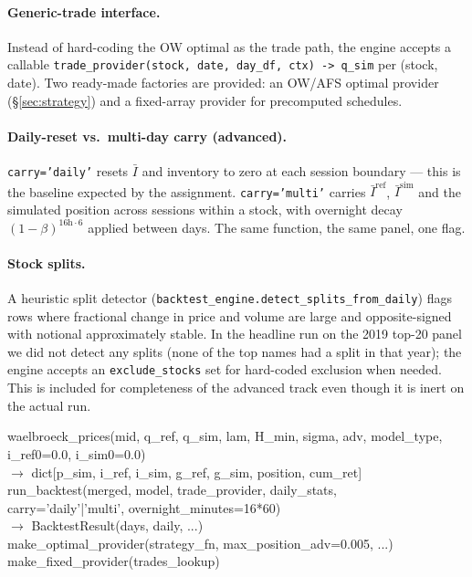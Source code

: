 \documentclass[11pt,a4paper]{article}
\begin{document}
\paragraph{Generic-trade interface.}  Instead of hard-coding the OW
optimal as the trade path, the engine accepts a callable
\texttt{trade\_provider(stock, date, day\_df, ctx) -> q\_sim} per
(stock, date).  Two ready-made factories are provided: an OW/AFS optimal
provider (\S\ref{sec:strategy}) and a fixed-array provider for
precomputed schedules.

\paragraph{Daily-reset vs.\ multi-day carry (advanced).}
\texttt{carry='daily'} resets $\bar I$ and inventory to zero at each
session boundary --- this is the baseline expected by the assignment.
\texttt{carry='multi'} carries $\bar I^{\text{ref}}$, $\bar I^{\text{sim}}$
and the simulated position across sessions within a stock, with overnight
decay $(1-\beta)^{16\text{h}\cdot 6}$ applied between days.  The same
function, the same panel, one flag.

\paragraph{Stock splits.}  A heuristic split detector
(\texttt{backtest\_engine.detect\_splits\_from\_daily}) flags rows where
fractional change in price and volume are large and opposite-signed with
notional approximately stable.  In the headline run on the 2019 top-20
panel we did not detect any splits (none of the top names had a split in
that year); the engine accepts an \texttt{exclude\_stocks} set for
hard-coded exclusion when needed.  This is included for completeness of
the advanced track even though it is inert on the actual run.

\begin{sigbox}
\noindent
waelbroeck\_prices(mid, q\_ref, q\_sim, lam, H\_min, sigma, adv, model\_type,\\
\hspace*{8em}i\_ref0=0.0, i\_sim0=0.0)\\
\hspace*{1em}$\rightarrow$ dict[p\_sim, i\_ref, i\_sim, g\_ref, g\_sim, position, cum\_ret] \\[2pt]
run\_backtest(merged, model, trade\_provider, daily\_stats,\\
\hspace*{6.5em}carry='daily'|'multi', overnight\_minutes=16*60)\\
\hspace*{1em}$\rightarrow$ BacktestResult(days, daily, ...) \\[2pt]
make\_optimal\_provider(strategy\_fn, max\_position\_adv=0.005, ...)\\
make\_fixed\_provider(trades\_lookup)
\end{sigbox}
\end{document}
